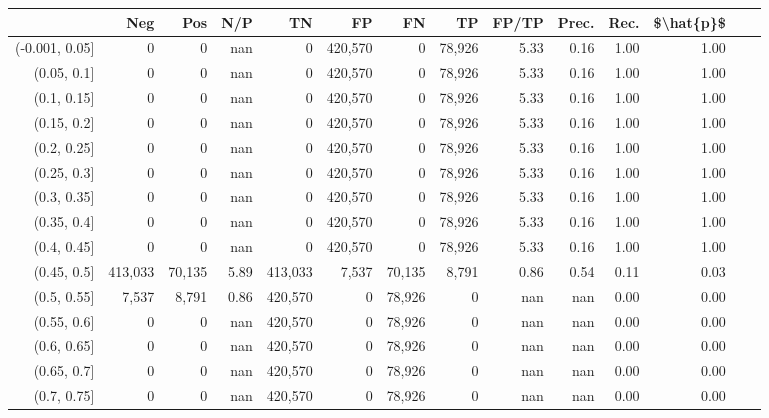 \begin{tabular}{rrrrrrrrrrrrrr}
\toprule
{} &      Neg &     Pos &   N/P &       TN &       FP &      FN &      TP & FP/TP & Prec. &  Rec. & \$\textbackslash hat\{p\}\$ \\
\midrule
(-0.001, 0.05] &        0 &       0 &   nan &        0 &  420,570 &       0 &  78,926 &  5.33 &  0.16 &  1.00 &      1.00 \\
(0.05, 0.1]    &        0 &       0 &   nan &        0 &  420,570 &       0 &  78,926 &  5.33 &  0.16 &  1.00 &      1.00 \\
(0.1, 0.15]    &        0 &       0 &   nan &        0 &  420,570 &       0 &  78,926 &  5.33 &  0.16 &  1.00 &      1.00 \\
(0.15, 0.2]    &        0 &       0 &   nan &        0 &  420,570 &       0 &  78,926 &  5.33 &  0.16 &  1.00 &      1.00 \\
(0.2, 0.25]    &        0 &       0 &   nan &        0 &  420,570 &       0 &  78,926 &  5.33 &  0.16 &  1.00 &      1.00 \\
(0.25, 0.3]    &        0 &       0 &   nan &        0 &  420,570 &       0 &  78,926 &  5.33 &  0.16 &  1.00 &      1.00 \\
(0.3, 0.35]    &        0 &       0 &   nan &        0 &  420,570 &       0 &  78,926 &  5.33 &  0.16 &  1.00 &      1.00 \\
(0.35, 0.4]    &        0 &       0 &   nan &        0 &  420,570 &       0 &  78,926 &  5.33 &  0.16 &  1.00 &      1.00 \\
(0.4, 0.45]    &        0 &       0 &   nan &        0 &  420,570 &       0 &  78,926 &  5.33 &  0.16 &  1.00 &      1.00 \\
(0.45, 0.5]    &  413,033 &  70,135 &  5.89 &  413,033 &    7,537 &  70,135 &   8,791 &  0.86 &  0.54 &  0.11 &      0.03 \\
(0.5, 0.55]    &    7,537 &   8,791 &  0.86 &  420,570 &        0 &  78,926 &       0 &   nan &   nan &  0.00 &      0.00 \\
(0.55, 0.6]    &        0 &       0 &   nan &  420,570 &        0 &  78,926 &       0 &   nan &   nan &  0.00 &      0.00 \\
(0.6, 0.65]    &        0 &       0 &   nan &  420,570 &        0 &  78,926 &       0 &   nan &   nan &  0.00 &      0.00 \\
(0.65, 0.7]    &        0 &       0 &   nan &  420,570 &        0 &  78,926 &       0 &   nan &   nan &  0.00 &      0.00 \\
(0.7, 0.75]    &        0 &       0 &   nan &  420,570 &        0 &  78,926 &       0 &   nan &   nan &  0.00 &      0.00 \\

\end{tabular}
